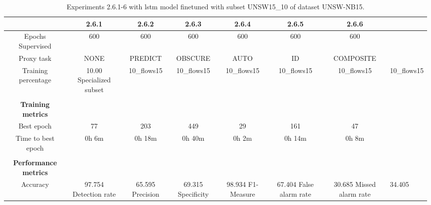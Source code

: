 \begin{table}[htb]
    \centering
    \begin{tabular}{@{}ccccccc@{}}
        \toprule
         & 2.6.1 & 2.6.2 & 2.6.3 & 2.6.4 & 2.6.5 & 2.6.6 \\
        \midrule
        Epochs Supervised &  600 &  600 &  600 &  600 &  600 &  600 \\
        Proxy task &  NONE &  PREDICT &  OBSCURE &  AUTO &  ID &  COMPOSITE \\
        Training percentage &  10.00 %
        Specialized subset &  10_flows15 &  10_flows15 &  10_flows15 &  10_flows15 &  10_flows15 &  10_flows15 \\
         \\
        \textbf{Training metrics} &  &  &  &  &  &  \\
        Best epoch &  77 &  203 &  449 &  29 &  161 &  47 \\
        Time to best epoch &  0h 6m &  0h 18m &  0h 40m &  0h 2m &  0h 14m &  0h 8m \\
         \\
        \textbf{Performance metrics} &  &  &  &  &  &  \\
        Accuracy &  97.754 %
        Detection rate &  65.595 %
        Precision &  69.315 %
        Specificity &  98.934 %
        F1-Measure &  67.404 %
        False alarm rate &  30.685 %
        Missed alarm rate &  34.405 %
        \bottomrule
    \end{tabular}
    \caption{Experiments 2.6.1-6 with \gls{lstm} model finetuned with subset UNSW15\_10 of dataset UNSW-NB15.}
    \label{table:results:lstm:stats_flows15_subset}
\end{table}